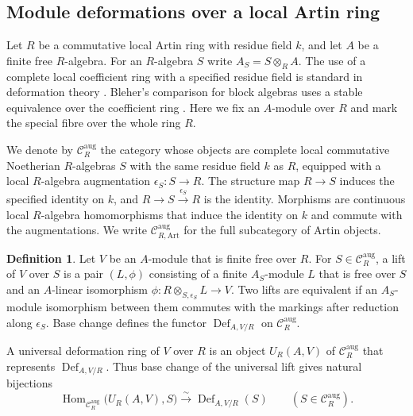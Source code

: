 \documentclass[12pt,a4paper,english,reqno]{amsart}
\numberwithin{equation}{section}
\theoremstyle{plain}
\theoremstyle{definition}
\newtheorem{definition}[theorem]{Definition}
\begin{document}
\subsection{Module deformations over a local Artin ring}
\label{subsec:artin-module-deformations}

Let $R$ be a commutative local Artin ring with residue field $k$,
and let $A$ be a finite free $R$-algebra. For an $R$-algebra $S$
write $A_S=S\otimes_R A$. The use of a complete local coefficient
ring with a specified residue field is standard in deformation
theory \cite{Schlessinger1968,BleherDihedral2009,BleherChinburgSoto2019}.
Bleher's comparison for block algebras uses a stable equivalence
over the coefficient ring \cite[Lemma~2.2.2]{BleherDihedral2009}.
Here we fix an $A$-module over $R$ and mark the special fibre
over the whole ring $R$.

We denote by $\mathcal C_R^{\mathrm{aug}}$ the category whose
objects are complete local commutative Noetherian $R$-algebras
$S$ with the same residue field $k$ as $R$, equipped with a local
$R$-algebra augmentation $\epsilon_S:S\to R$. The structure
map $R\to S$ induces the specified identity on $k$, and
$R\to S\xrightarrow{\epsilon_S}R$ is the identity. Morphisms
are continuous local $R$-algebra homomorphisms that induce the
identity on $k$ and commute with the augmentations. We write
$\mathcal C_{R,\mathrm{Art}}^{\mathrm{aug}}$ for the full
subcategory of Artin objects.

\begin{definition}\label{def:artin-module-deformations}
Let $V$ be an $A$-module that is finite free over $R$.
For $S\in\mathcal C_R^{\mathrm{aug}}$, a lift of $V$ over $S$
is a pair $(L,\phi)$ consisting of a finite $A_S$-module $L$
that is free over $S$ and an $A$-linear isomorphism
$\phi:R\otimes_{S,\epsilon_S}L\to V$. Two lifts are equivalent
if an $A_S$-module isomorphism between them commutes with the
markings after reduction along $\epsilon_S$. Base change
defines the functor $\operatorname{Def}_{A,V/R}$ on
$\mathcal C_R^{\mathrm{aug}}$.

A universal deformation ring of $V$ over $R$ is an object
$U_R(A,V)$ of $\mathcal C_R^{\mathrm{aug}}$ that represents
$\operatorname{Def}_{A,V/R}$. Thus base change of the universal
lift gives natural bijections
\[
 \operatorname{Hom}_{\mathcal C_R^{\mathrm{aug}}}
       \bigl(U_R(A,V),S\bigr)
  \xrightarrow{\ \sim\ }\operatorname{Def}_{A,V/R}(S)
 \qquad(S\in\mathcal C_R^{\mathrm{aug}}).
\]
\end{definition}
\end{document}
